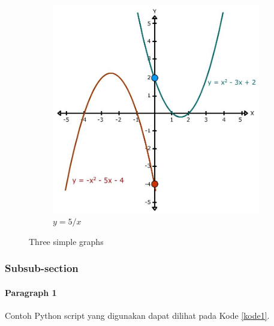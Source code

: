 \begin{figure}
     \begin{subfigure}[b]{0.3\textwidth}
         \centering
         \includegraphics[width=\textwidth]{assets/pics/graph3.jpg}
         \caption{$y=5/x$}
         \label{fig:five over x}
     \end{subfigure}
        \caption{Three simple graphs}
        \label{fig:three graphs}
\end{figure}


\subsubsection{Subsub-section}

\paragraph{Paragraph 1}

Contoh Python script yang digunakan dapat dilihat pada Kode \ref{kode1}.

